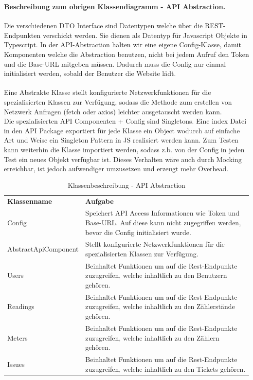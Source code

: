 \textbf{Beschreibung zum obrigen Klassendiagramm - API Abstraction.} \\ \\
Die verschiedenen DTO Interface sind Datentypen welche über die REST-Endpunkten verschickt werden. Sie dienen als Datentyp für Javascript Objekte in Typescript. In der API-Abstraction halten wir eine eigene Config-Klasse, damit Komponenten welche die Abstraction benutzen, nicht bei jedem Aufruf den Token und die Base-URL mitgeben müssen. Dadurch muss die Config nur einmal initialisiert werden, sobald der Benutzer die Website lädt. \\ \\
Eine Abstrakte Klasse stellt konfigurierte Netzwerkfunktionen für die spezialisierten Klassen zur Verfügung, sodass die Methode zum erstellen von Netzwerk Anfragen (fetch oder axios) leichter ausgetauscht werden kann. \\
Die spezialisierten API Componenten + Config sind Singletons. Eine index Datei in den API Package exportiert für
jede Klasse ein Object wodurch auf einfache Art und Weise ein Singleton Pattern in JS realisiert werden kann.
Zum Testen kann weiterhin die Klasse importiert werden, sodass z.b. von der Config in jeden Test ein neues
Objekt verfügbar ist. Dieses Verhalten wäre auch durch Mocking erreichbar, ist jedoch aufwendiger umzusetzen und erzeugt mehr Overhead. \\

\begin{table}[h]
	\centering
	\begin{tabularx}{\textwidth}{X X}
		\rowcolor[HTML]{C0C0C0} 
		\textbf{Klassenname} & \textbf{Aufgabe} \\
		Config& Speichert API Access Informationen wie Token und Base-URL. Auf diese kann nicht zugegriffen werden, bevor die Config initialisiert wurde.  \\
		\rowcolor[HTML]{E7E7E7} 
		AbstractApiComponent & Stellt konfigurierte Netzwerkfunktionen für die spezialisierten Klassen zur Verfügung. \\
		Users & Beinhaltet Funktionen um auf die Rest-Endpunkte zuzugreifen, welche inhaltlich zu den Benutzern gehören. \\
		\rowcolor[HTML]{E7E7E7} 
		Readings & Beinhaltet Funktionen um auf die Rest-Endpunkte zuzugreifen, welche inhaltlich zu den Zählerstände gehören. \\
		Meters & Beinhaltet Funktionen um auf die Rest-Endpunkte zuzugreifen, welche inhaltlich zu den Zählern gehören. \\
		\rowcolor[HTML]{E7E7E7} 
		Issues & Beinhaltet Funktionen um auf die Rest-Endpunkte zuzugreifen, welche inhaltlich zu den Tickets gehören. \\
	\end{tabularx}
	\caption{Klassenbeschreibung - API Abstraction}
	\label{table:klassenbeschreibung-api Abstraction}
\end{table}



